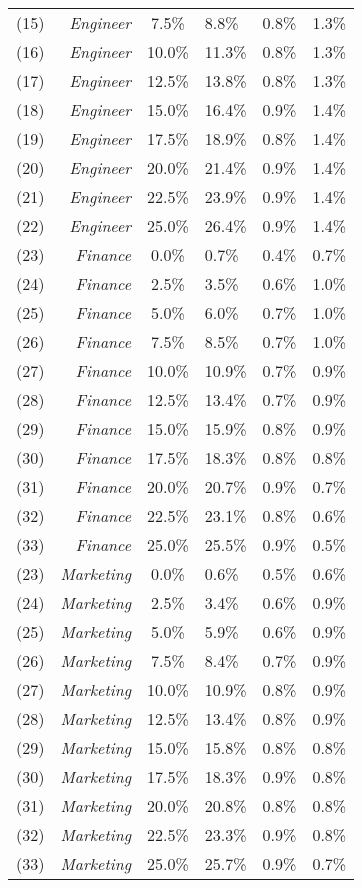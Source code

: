 \begin{supptable}[htb!]
\begin{center}
\begin{tabular}{lrcllc}
(15) & \emph{Engineer} & 7.5\% & 8.8\% & 0.8\% & 1.3\% \\
(16) & \emph{Engineer} & 10.0\% & 11.3\% & 0.8\% & 1.3\% \\
(17) & \emph{Engineer} & 12.5\% & 13.8\% & 0.8\% & 1.3\% \\
(18) & \emph{Engineer} & 15.0\% & 16.4\% & 0.9\% & 1.4\% \\
(19) & \emph{Engineer} & 17.5\% & 18.9\% & 0.8\% & 1.4\% \\
(20) & \emph{Engineer} & 20.0\% & 21.4\% & 0.9\% & 1.4\% \\
(21) & \emph{Engineer} & 22.5\% & 23.9\% & 0.9\% & 1.4\% \\
(22) & \emph{Engineer} & 25.0\% & 26.4\% & 0.9\% & 1.4\% \\
\cmidrule{1-6}
(23) & \emph{Finance} & 0.0\% & 0.7\% & 0.4\% & 0.7\% \\
(24) & \emph{Finance} & 2.5\% & 3.5\% & 0.6\% & 1.0\% \\
(25) & \emph{Finance} & 5.0\% & 6.0\% & 0.7\% & 1.0\% \\
(26) & \emph{Finance} & 7.5\% & 8.5\% & 0.7\% & 1.0\% \\
(27) & \emph{Finance} & 10.0\% &10.9\% & 0.7\% & 0.9\% \\
(28) & \emph{Finance} & 12.5\% & 13.4\% & 0.7\% & 0.9\% \\
(29) & \emph{Finance} & 15.0\% & 15.9\% & 0.8\% & 0.9\% \\
(30) & \emph{Finance} & 17.5\% & 18.3\% & 0.8\% & 0.8\% \\
(31) & \emph{Finance} & 20.0\% & 20.7\% & 0.9\% & 0.7\% \\
(32) & \emph{Finance} & 22.5\% & 23.1\% & 0.8\% & 0.6\% \\
(33) & \emph{Finance} & 25.0\% & 25.5\% & 0.9\% & 0.5\% \\
\cmidrule{1-6}
(23) & \emph{Marketing} & 0.0\% & 0.6\% & 0.5\% & 0.6\% \\
(24) & \emph{Marketing} & 2.5\% & 3.4\% & 0.6\% & 0.9\% \\
(25) & \emph{Marketing} & 5.0\% & 5.9\% & 0.6\% & 0.9\% \\
(26) & \emph{Marketing} & 7.5\% & 8.4\% & 0.7\% & 0.9\% \\
(27) & \emph{Marketing} & 10.0\% &10.9\% & 0.8\% & 0.9\% \\
(28) & \emph{Marketing} & 12.5\% & 13.4\% & 0.8\% & 0.9\% \\
(29) & \emph{Marketing} & 15.0\% & 15.8\% & 0.8\% & 0.8\% \\
(30) & \emph{Marketing} & 17.5\% & 18.3\% & 0.9\% & 0.8\% \\
(31) & \emph{Marketing} & 20.0\% & 20.8\% & 0.8\% & 0.8\% \\
(32) & \emph{Marketing} & 22.5\% & 23.3\% & 0.9\% & 0.8\% \\
(33) & \emph{Marketing} & 25.0\% & 25.7\% & 0.9\% & 0.7\% \\
\cmidrule[\heavyrulewidth]{1-6}
\end{tabular}
\end{center}
\vspace{-5mm}
\end{supptable}
